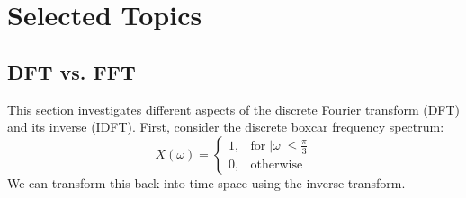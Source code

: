 \message{ !name(austin_report.tex)}\documentclass[11pt, letterpage]{article}
\begin{document}


\section{Selected Topics}

\subsection{DFT vs. FFT}
This section investigates different aspects of the discrete Fourier transform
(DFT) and its inverse (IDFT). First, consider the discrete boxcar frequency
spectrum:
\begin{equation}
  X(\omega) = \left\{
  \begin{array}{ll}
    1, & \text{for} \; |\omega| \leq \frac{\pi}{3} \\
    0, & \text{otherwise}
  \end{array}
  \right.
\end{equation}
We can transform this back into time space using the inverse transform.
\end{document}
